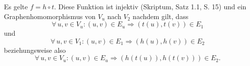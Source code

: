 \documentclass{article}
\begin{document}
Es gelte $f = h \circ t$. Diese Funktion ist injektiv (Skriptum, Satz 1.1, S. 15) und ein Graphenhomomorphismus von $V_u$ nach $V_2$ nachdem gilt, dass
\begin{equation*}
    \forall\, u, v \in V_u : (u, v) \in E_u \Rightarrow (t(u), t(v)) \in E_1
\end{equation*}
und
\begin{equation*}
    \forall\, u, v \in V_1 : (u, v) \in E_1 \Rightarrow (h(u), h(v)) \in E_2
\end{equation*}
beziehungsweise also
\begin{equation*}
    \forall\, u, v \in V_u : (u, v) \in E_u \Rightarrow (h(t(u)), h(t(v))) \in E_2.
\end{equation*}
\end{document}
